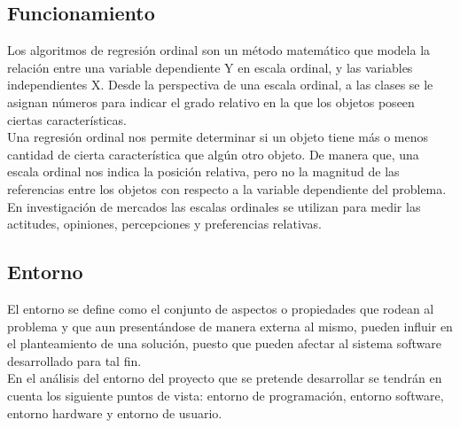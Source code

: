 		\subsection{Funcionamiento}
		
			Los algoritmos de regresión ordinal son un método matemático que modela la relación entre una variable dependiente Y en escala ordinal, y las variables independientes X. Desde la perspectiva de una escala ordinal, a las clases se le asignan números para indicar el grado relativo en la que los objetos poseen ciertas características.\\

			Una regresión ordinal nos permite determinar si un objeto tiene más o menos cantidad de cierta característica que algún otro objeto. De manera que, una escala ordinal nos indica la posición relativa, pero no la magnitud de las referencias entre los objetos con respecto a la variable dependiente del problema.\\

			En investigación de mercados las escalas ordinales se utilizan para medir las actitudes, opiniones, percepciones y preferencias relativas.
		
		\subsection{Entorno}
		
			El entorno se define como el conjunto de aspectos o propiedades que rodean al problema y que aun presentándose de manera externa al mismo, pueden influir en el planteamiento de una solución, puesto que pueden afectar al sistema software desarrollado para tal fin.\\

			En el análisis del entorno del proyecto que se pretende desarrollar se tendrán en cuenta los siguiente puntos de vista: entorno de programación, entorno software, entorno hardware y entorno de usuario.\\

